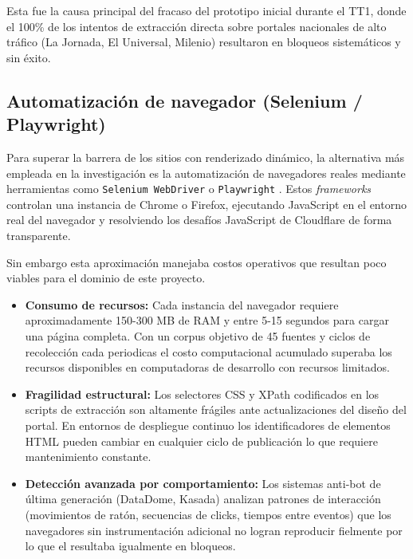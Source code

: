 Esta fue la causa principal del fracaso del prototipo inicial durante el TT1, donde
el 100\% de los intentos de extracción directa sobre portales nacionales de alto
tráfico (La Jornada, El Universal, Milenio) resultaron en bloqueos sistemáticos y 
sin éxito.

\subsection{Automatización de navegador (Selenium / Playwright)}
\label{subsec:ea_selenium}

Para superar la barrera de los sitios con renderizado dinámico, la alternativa más
empleada en la investigación es la automatización de navegadores reales mediante
herramientas como \texttt{Selenium WebDriver} o \texttt{Playwright}
\cite{leotta2018web}. Estos \textit{frameworks} controlan una instancia
de Chrome o Firefox, ejecutando JavaScript en el entorno real del navegador y
resolviendo los desafíos JavaScript de Cloudflare de forma transparente.

Sin embargo esta aproximación manejaba costos operativos que resultan poco viables para
el dominio de este proyecto.

\begin{itemize}
    \item \textbf{Consumo de recursos:} Cada instancia del navegador requiere
          aproximadamente 150-300 MB de RAM y entre 5-15 segundos para cargar
          una página completa. Con un corpus objetivo de 45 fuentes y ciclos de
          recolección cada periodicas el costo computacional acumulado superaba los
          recursos disponibles en computadoras de desarrollo con recursos limitados.

    \item \textbf{Fragilidad estructural:} Los selectores CSS y XPath codificados
          en los scripts de extracción son altamente frágiles ante
          actualizaciones del diseño del portal. En entornos de despliegue continuo
          los identificadores de elementos HTML pueden cambiar en cualquier
          ciclo de publicación lo que requiere mantenimiento constante.

    \item \textbf{Detección avanzada por comportamiento:} Los sistemas anti-bot de
          última generación (DataDome, Kasada) analizan patrones de interacción
          (movimientos de ratón, secuencias de clicks, tiempos entre eventos) que
          los navegadores sin instrumentación adicional no logran reproducir
          fielmente por lo que el resultaba igualmente en bloqueos.
\end{itemize}

